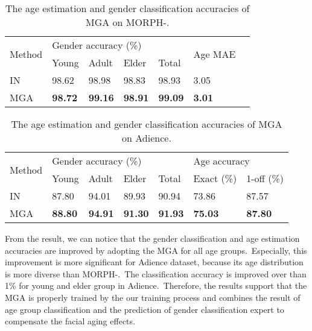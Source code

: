 \documentclass[10pt,twocolumn,letterpaper]{article}
\begin{document}
\begin{table}[!h]
\centering
\caption{The age estimation and gender classification accuracies of MGA on MORPH-.}
\label{The age and gender classification accuracy of MGA on MORPH}

\begin{adjustbox}{width=0.46\textwidth}
\begin{tabular}{p{3.5cm}llllll}
\hline
\multirow{2}{*}{Method} & \multicolumn{4}{l}{Gender accuracy (\%)} & \multirow{2}{*}{Age MAE} \\ \cline{2-5}
 & Young & Adult & Elder & Total &  \\ \hline
IN & 98.62 & 98.98 & 98.83 & 98.93 & 3.05 \\
MGA & \textbf{98.72} & \textbf{99.16} & \textbf{98.91} & \textbf{99.09} & \textbf{3.01} \\ \hline
\end{tabular}
\end{adjustbox}
\end{table}

\begin{table}[!h]
\centering
\caption{The age estimation and gender classification accuracies of MGA on Adience.}
\label{The age and gender classification accuracy of MGA on Adience}

\begin{adjustbox}{width=0.46\textwidth}
\begin{tabular}{p{2cm}llllll}

\hline
\multirow{2}{*}{Method} & \multicolumn{4}{l}{Gender accuracy (\%)} & \multicolumn{2}{l}{Age accuracy} \\ \cline{2-7} 
 & Young & Adult & Elder & Total & Exact (\%) & 1-off (\%) \\ \hline
IN & 87.80 & 94.01 & 89.93 & 90.94 & 73.86 & 87.57 \\
MGA & \textbf{88.80} & \textbf{94.91} & \textbf{91.30} & \textbf{91.93} & \textbf{75.03} & \textbf{87.80} \\ \hline
\end{tabular}
\end{adjustbox}
\end{table}

From the result, we can notice that the gender classification and age estimation accuracies are improved by adopting the MGA for all age groups.~Especially, this improvement is more significant for Adience dataset, because its age distribution is more diverse than MORPH-.~The classification accuracy is improved over than 1\% for young and elder group in Adience.~Therefore, the results support that the MGA is properly trained by the our training process and combines the result of age group classification and the prediction of gender classification expert to compensate the facial aging effects.
\end{document}
